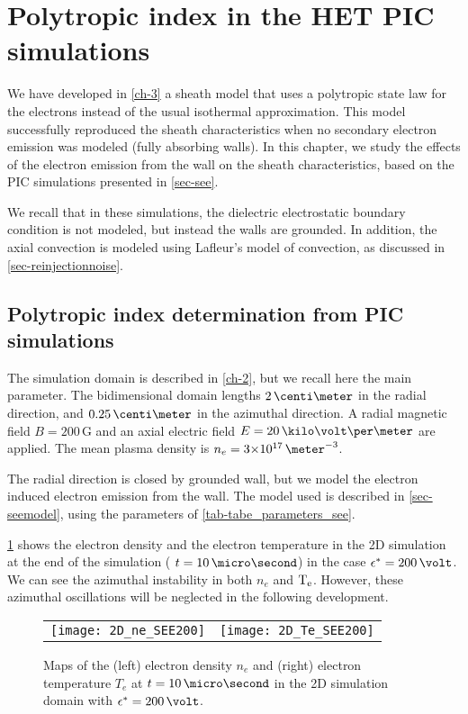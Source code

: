

\section{Polytropic index in the \ac{HET} \ac{PIC} simulations}
\label{sec-PIC_poly}

We have developed in \cref{ch-3} a sheath model that uses a polytropic state law for the electrons instead of the usual isothermal approximation.
This model successfully reproduced the sheath characteristics  when no secondary electron emission was modeled (fully absorbing walls).
In this chapter, we study the effects of the electron emission from the wall on the sheath characteristics, based on the \ac{PIC} simulations presented in \cref{sec-see}.

We recall that in these simulations, the dielectric electrostatic boundary condition is not modeled, but instead the walls are grounded.
In addition, the axial convection is modeled using Lafleur's model of convection, as discussed in \cref{sec-reinjectionnoise}.

\subsection{Polytropic index determination from PIC simulations} \label{subsec-fluid_see_polyfit}


The simulation domain is described in \cref{ch-2}, but we recall here the main parameter.
The bidimensional domain lengths $2\,\centi\meter$ in the radial direction, and $0.25\,\centi\meter$ in the azimuthal direction.
A radial magnetic field $B=200\,$G and an axial electric field $E=20\,\kilo\volt\per\meter$ are applied.
The mean plasma density is $n_e = \sn{3}{17}\,\meter^{-3}$.

The radial direction is closed by grounded wall, but we model the electron induced electron emission from the wall.
The model used is described in \cref{sec-seemodel}, using the parameters of \cref{tab-tabe_parameters_see}.

\cref{fig-2DneTe} shows the electron density and the electron temperature in the \ac{2D} simulation at the end of the simulation ( $t=10\,\micro\second$) in the case $\crover=200\,\volt$.
We can see the azimuthal instability in both $n_e$ and $\mathrm{T_e}$.
However, these azimuthal oscillations will be neglected in the following development. 
\begin{figure}[hbtp]
  \centering
  \begin{tabular}{c c}
    \texttt{[image: 2D\_ne\_SEE200]} &
    \texttt{[image: 2D\_Te\_SEE200]} \\
  \end{tabular}
  \caption{Maps of the (left) electron density $n_e$ and (right) electron temperature $T_e$ at $t=10\,\micro\second$ in the \ac{2D} simulation domain with $\crover=200\,\volt$.}
  \label{fig-2DneTe}
\end{figure}




